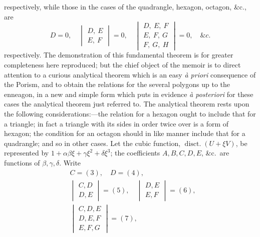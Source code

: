 \documentclass[11pt]{article}
\begin{document}
\noindent respectively, while those in the cases of the quadrangle, hexagon, octagon, \&c., are
\[
   D = 0,\quad
   \begin{vmatrix} D,\ E\\ E,\ F\end{vmatrix} = 0,\quad
   \begin{vmatrix} D,\ E,\ F\\ E,\ F,\ G\\ F,\ G,\ H\end{vmatrix} = 0,\quad \&c.
\]
respectively. The demonstration of this fundamental theorem is for greater completeness here reproduced; but the chief object of the memoir is to direct attention to a curious analytical theorem which is an easy \textit{\`a priori} consequence of the Porism, and to obtain the relations for the several polygons up to the enneagon, in a new and simple form which puts in evidence \textit{\`a posteriori} for these cases the analytical theorem just referred to. The analytical theorem rests upon the following considerations:---the relation for a hexagon ought to include that for a triangle; in fact a triangle with its sides in order twice over is a form of hexagon; the condition for an octagon should in like manner include that for a quadrangle; and so in other cases. Let the cubic function, $\operatorname{disct.}(U + \xi V)$, be represented by $1 + \alpha\beta\xi + \gamma\xi^2 + \delta\xi^3$; the coefficients $A, B, C, D, E$, \&c.\ are functions of $\beta, \gamma, \delta$. Write
\[
\begin{aligned}
   & C = (3),\quad D = (4),\\
   & \begin{vmatrix} C, D\\ D, E\end{vmatrix} = (5),\quad
     \begin{vmatrix} D, E\\ E, F\end{vmatrix} = (6),\\
   & \begin{vmatrix} C, D, E\\ D, E, F\\ E, F, G\end{vmatrix} = (7),
\end{aligned}
\]
\end{document}
